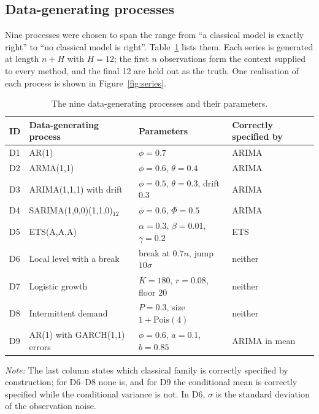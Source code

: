 \documentclass[article]{ajs}
\providecommand{\tableref}[1]{Table~\ref{#1}}
\providecommand{\figureref}[1]{Figure~\ref{#1}}
\begin{document}
\subsection{Data-generating processes}
\label{sec:dgps}

Nine processes were chosen to span the range from ``a classical model is exactly right'' to
``no classical model is right''. \tableref{tab:dgps} lists them. Each series is generated at
length $n + H$ with $H = 12$; the first $n$ observations form the context supplied to every
method, and the final 12 are held out as the truth. One realisation of each process is shown
in \figureref{fig:series}.

\begin{table}[!htbp]
\centering
\begin{threeparttable}
\caption{The nine data-generating processes and their parameters.}
\label{tab:dgps}
\small\setlength{\tabcolsep}{4pt}
\begin{tabular}{llll}
\toprule
ID & Data-generating process & Parameters & Correctly specified by \\
\midrule
D1 & AR(1)                        & $\phi = 0.7$                                & ARIMA \\
D2 & ARMA(1,1)                    & $\phi = 0.6$, $\theta = 0.4$                & ARIMA \\
D3 & ARIMA(1,1,1) with drift      & $\phi = 0.5$, $\theta = 0.3$, drift $0.3$   & ARIMA \\
D4 & SARIMA(1,0,0)(1,1,0)$_{12}$  & $\phi = 0.6$, $\Phi = 0.5$                  & ARIMA \\
D5 & ETS(A,A,A)                   & $\alpha = 0.3$, $\beta = 0.01$, $\gamma = 0.2$ & ETS \\
D6 & Local level with a break     & break at $0.7n$, jump $10\sigma$            & neither \\
D7 & Logistic growth              & $K = 180$, $r = 0.08$, floor $20$           & neither \\
D8 & Intermittent demand          & $P = 0.3$, size $1 + \mathrm{Pois}(4)$      & neither \\
D9 & AR(1) with GARCH(1,1) errors & $\phi = 0.6$, $a = 0.1$, $b = 0.85$         & ARIMA in mean \\
\bottomrule
\end{tabular}
\begin{tablenotes}[flushleft]\footnotesize
\item \textit{Note:} The last column states which classical family is correctly specified by
construction; for D6--D8 none is, and for D9 the conditional mean is correctly specified while
the conditional variance is not. In D6, $\sigma$ is the standard deviation of the observation
noise.
\end{tablenotes}
\end{threeparttable}
\end{table}
\end{document}
